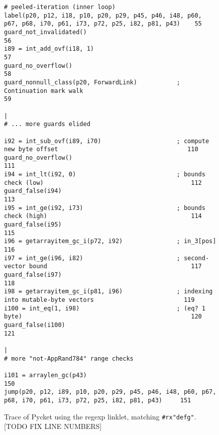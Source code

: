 \begin{figure}[!htbp]
\begin{lstlisting}[style=rptrace-style]
# peeled-iteration (inner loop)
label(p20, p12, i18, p10, p20, p29, p45, p46, i48, p60, p67, p68, i70, p61, i73, p72, p25, i82, p81, p43)    55
guard_not_invalidated()                                                                                      56
i89 = int_add_ovf(i18, 1)                                                                                    57
guard_no_overflow()                                                                                          58
guard_nonnull_class(p20, ForwardLink)           ; Continuation mark walk                                     59
                                                                                                             |
# ... more guards elided

i92 = int_sub_ovf(i89, i70)                     ; compute new byte offset                                    110
guard_no_overflow()                                                                                          111
i94 = int_lt(i92, 0)                            ; bounds check (low)                                         112
guard_false(i94)                                                                                             113
i95 = int_ge(i92, i73)                          ; bounds check (high)                                        114
guard_false(i95)                                                                                             115
i96 = getarrayitem_gc_i(p72, i92)               ; in_3[pos]                                                  116
i97 = int_ge(i96, i82)                          ; second-vector bound                                        117
guard_false(i97)                                                                                             118
i98 = getarrayitem_gc_i(p81, i96)               ; indexing into mutable-byte vectors                         119
i100 = int_eq(1, i98)                           ; (eq? 1 byte)                                               120
guard_false(i100)                                                                                            121
                                                                                                             |
# more "not-AppRand784" range checks

i101 = arraylen_gc(p43)                                                                                      150
jump(p20, p12, i89, p10, p20, p29, p45, p46, i48, p60, p67, p68, i70, p61, i73, p72, p25, i82, p81, p43)     151
\end{lstlisting}

\caption{\small Trace of Pycket using the regexp linklet, matching
		{\tt\#rx"defg"}. [TODO FIX LINE NUMBERS]}
\label{fig:regexp-linklet-big-trace}
\end{figure}